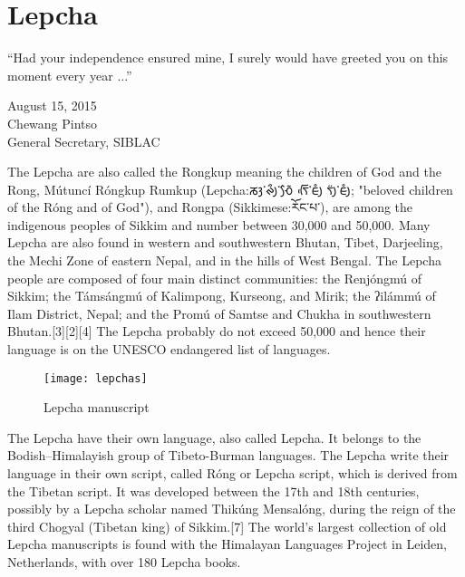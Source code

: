 \newfontfamily{}
\newfontfamily{}
\section{Lepcha}
\label{s:lepcha}
\epigraph{``Had your independence ensured mine, I surely would have greeted you on this moment every year ...''}{
August 15, 2015\\
Chewang Pintso\\
General Secretary, SIBLAC}

\label{s:lepcha}



The Lepcha are also called the Rongkup meaning the children of God and the Rong, Mútuncí Róngkup Rumkup (Lepcha:{\lepcha ᰕᰫ་ᰊᰪᰰ་ᰆᰧᰶ ᰛᰩᰵ་ᰀᰪᰱ ᰛᰪᰮ་ᰀᰪᰱ}; "beloved children of the Róng and of God"), and Rongpa (Sikkimese:{\sikkim རོང་པ་}), are among the indigenous peoples of Sikkim and number between 30,000 and 50,000. Many Lepcha are also found in western and southwestern Bhutan, Tibet, Darjeeling, the Mechi Zone of eastern Nepal, and in the hills of West Bengal. The Lepcha people are composed of four main distinct communities: the Renjóngmú of Sikkim; the Támsángmú of Kalimpong, Kurseong, and Mirik; the ʔilámmú of Ilam District, Nepal; and the Promú of Samtse and Chukha in southwestern Bhutan.[3][2][4]
 The Lepcha probably do not exceed 50,000 and hence their language is on the \textsc{UNESCO} endangered list of languages.

\begin{figure}[htbp]
\centering
\texttt{[image: lepchas]}

\caption{Lepcha manuscript}

\end{figure}

The Lepcha have their own language, also called Lepcha. It belongs to the Bodish–Himalayish group of Tibeto-Burman languages. The Lepcha write their language in their own script, called Róng or Lepcha script, which is derived from the Tibetan script. It was developed between the 17th and 18th centuries, possibly by a Lepcha scholar named Thikúng Mensalóng, during the reign of the third Chogyal (Tibetan king) of Sikkim.[7] The world's largest collection of old Lepcha manuscripts is found with the Himalayan Languages Project in Leiden, Netherlands, with over 180 Lepcha books.


